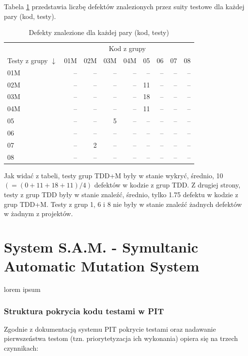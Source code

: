 \documentclass[11pt,a4paper,oldfontcommands]{memoir}
\theoremstyle{plain}
\theoremstyle{definition}
\theoremstyle{remark}
\begin{document}
Tabela \ref{tab:StudExp02_defects} przedstawia liczbę defektów znalezionych przez suity testowe dla każdej pary (kod, testy).

\begin{table}[H]
\centering
\caption{Defekty znalezione dla każdej pary (kod, testy) \label{tab:StudExp02_defects}}
\begin{tabular}{lrrrrrrrr}
\hline
 & \multicolumn{8}{c}{{Kod z grupy}} \\
Testy z grupy $\downarrow$ & 01M & 02M & 03M & 04M & 05 & 06 & 07 & 08 \\ \hline
01M & -- & -- & -- & -- & -- & -- & -- & -- \\
02M & -- & -- & -- & -- & 11 & -- & --  & -- \\
03M & -- & -- & -- & -- & 18 & -- & -- & -- \\
04M & -- & -- & -- & -- & 11 & -- & -- & -- \\
05  & -- & -- & 5  & -- & -- & -- & -- & -- \\
06  & -- & -- & -- & -- & -- & -- & -- & -- \\
07  & -- & 2  & -- & -- & -- & -- & -- & -- \\
08  & -- & -- & -- & -- & -- & -- & -- & -- \\ \hline
\end{tabular}
\end{table}

Jak widać z tabeli, testy grup TDD+M były w stanie wykryć, średnio, 10 $(=(0+11+18+11)/4)$ defektów w kodzie z grup TDD. Z drugiej strony, testy z grup TDD były w stanie znaleźć, średnio, tylko 1.75 defektu w kodzie z grup TDD+M. Testy z grup 1, 6 i 8 nie były w stanie znaleźć żadnych defektów w żadnym z projektów.












\chapter{System S.A.M. - Symultanic Automatic Mutation System \label{framework}} 

lorem ipsum

\subsection{Struktura pokrycia kodu testami w PIT}
Zgodnie z dokumentacją systemu PIT \cite{PIT} pokrycie testami oraz nadawanie pierwszeństwa testom (tzn. priorytetyzacja ich wykonania) opiera się na trzech czynnikach:
\end{document}
